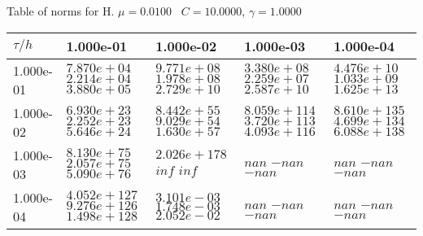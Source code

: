 \begin{center}
Table of norms for H. $\mu = 0.0100$ \, $C = 10.0000$, $\gamma = 1.0000$
  
\begin{tabular}{|p{1in}|p{1in}|p{1in}|p{1in}|p{1in}|} \hline
$\tau / h$ &1.000e-01 &1.000e-02 &1.000e-03 &1.000e-04 \\ \hline 
1.000e-01 & $7.870e+04$  $2.214e+04$  $3.880e+05$  & $9.771e+08$  $1.978e+08$  $2.729e+10$  & $3.380e+08$  $2.259e+07$  $2.587e+10$  & $4.476e+10$  $1.033e+09$  $1.625e+13$  \\ \hline 
1.000e-02 & $6.930e+23$  $2.252e+23$  $5.646e+24$  & $8.442e+55$  $9.029e+54$  $1.630e+57$  & $8.059e+114$  $3.720e+113$  $4.093e+116$  & $8.610e+135$  $4.699e+134$  $6.088e+138$  \\ \hline 
1.000e-03 & $8.130e+75$  $2.057e+75$  $5.090e+76$  & $2.026e+178$  $inf$  $inf$  & $nan$  $-nan$  $-nan$  & $nan$  $-nan$  $-nan$  \\ \hline 
1.000e-04 & $4.052e+127$  $9.276e+126$  $1.498e+128$  & $3.101e-03$  $1.748e-03$  $2.052e-02$  & $nan$  $-nan$  $-nan$  & $nan$  $-nan$  $-nan$  \\ \hline 

\end{tabular}\\[20pt]
\end{center}
